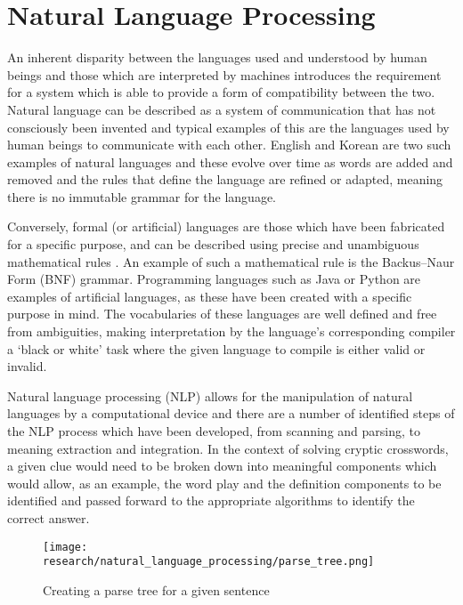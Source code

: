 \section{Natural Language Processing}

An inherent disparity between the languages used and understood by human beings and those which are interpreted by machines introduces the requirement for a system which is able to provide a form of compatibility between the two. Natural language can be described as 	a system of communication that has not consciously been invented \citep{collins04} and typical examples of this are the languages used by human beings to communicate with each other. English and Korean are two such examples of natural languages and these evolve over time as words are added and removed and the rules that define the language are refined or adapted, meaning there is no immutable grammar for the language.

Conversely, formal (or artificial) languages are those which have been fabricated for a specific purpose, and can be described using precise and unambiguous mathematical rules \citep{jiang10}. An example of such a mathematical rule is the Backus–Naur Form (BNF) grammar. Programming languages such as Java or Python are examples of artificial languages, as these have been created with a specific purpose in mind. The vocabularies of these languages are well defined and free from ambiguities, making interpretation by the language’s corresponding compiler a ‘black or white’ task where the given language to compile is either valid or invalid.

Natural language processing (NLP) allows for the manipulation of natural languages by a computational device \citep{bird09} and there are a number of identified steps of the NLP process which have been developed, from scanning and parsing, to meaning extraction and integration. In the context of solving cryptic crosswords, a given clue would need to be broken down into meaningful components which would allow, as an example, the word play and the definition components to be identified and passed forward to the appropriate algorithms to identify the correct answer.

\begin{figure}[!ht]
	\texttt{[image: research/natural\_language\_processing/parse\_tree.png]}
	\caption{Creating a parse tree for a given sentence}
\end{figure}

\begin{flushright}
	\citep{halpern13}
\end{flushright}


